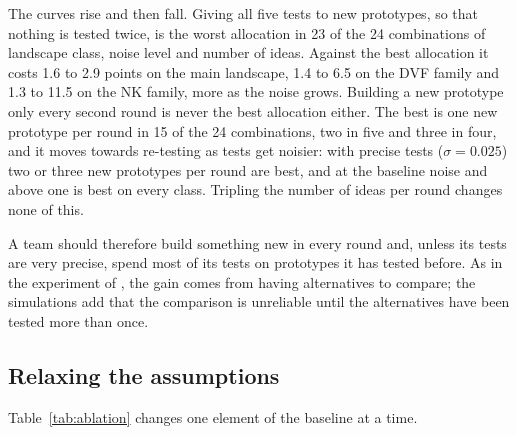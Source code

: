 \documentclass[preprint,review,11pt,authoryear]{elsarticle}
\theoremstyle{definition}
\begin{document}
The curves rise and then fall. Giving all five tests to new prototypes, so that nothing is tested twice, is the worst allocation in 23 of the 24 combinations of landscape class, noise level and number of ideas. Against the best allocation it costs 1.6 to 2.9 points on the main landscape, 1.4 to 6.5 on the DVF family and 1.3 to 11.5 on the NK family, more as the noise grows. Building a new prototype only every second round is never the best allocation either. The best is one new prototype per round in 15 of the 24 combinations, two in five and three in four, and it moves towards re-testing as tests get noisier: with precise tests ($\sigma=0.025$) two or three new prototypes per round are best, and at the baseline noise and above one is best on every class. Tripling the number of ideas per round changes none of this.

A team should therefore build something new in every round and, unless its tests are very precise, spend most of its tests on prototypes it has tested before. As in the experiment of \citet{dow2010}, the gain comes from having alternatives to compare; the simulations add that the comparison is unreliable until the alternatives have been tested more than once.

\subsection{Relaxing the assumptions}
\label{sec:ablation}

Table~\ref{tab:ablation} changes one element of the baseline at a time.
\end{document}
